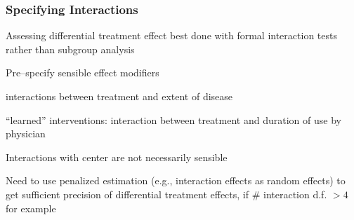\subsubsection{Specifying Interactions}
\bi
\item   Assessing differential treatment effect best done with formal interaction tests rather than subgroup analysis
\item   Pre--specify sensible effect modifiers
    \bi
    \item   interactions between treatment and extent of disease
    \item   ``learned'' interventions: interaction between treatment and duration of use by physician
    \ei
\item   Interactions with center are not necessarily sensible
\item   Need to use penalized estimation (e.g., interaction effects as random effects) to get sufficient precision of differential treatment effects, if \# interaction d.f. $> 4$ for example \cite{sar96hie,yam99inv} \ipacue
\ei
{}

